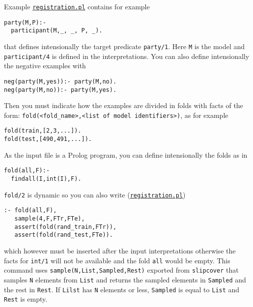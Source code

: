 Example \href{http://cplint.lamping.unife.it/example/registration.pl}{\texttt{registration.pl}} contains for example
\begin{verbatim}
party(M,P):-
  participant(M,_, _, P, _).
\end{verbatim}
that defines intensionally the target predicate \verb|party/1|. Here \verb|M| is the model and \verb|participant/4| is defined in the interpretations.
You can also define intensionally the negative examples with
\begin{verbatim}
neg(party(M,yes)):- party(M,no).
neg(party(M,no)):- party(M,yes).
\end{verbatim}
Then you must indicate how the examples are divided in folds with facts of the form:
\verb|fold(<fold_name>,<list of model identifiers>)|, as for example
\begin{verbatim}
fold(train,[2,3,...]).
fold(test,[490,491,...]).
\end{verbatim}
As the input file is a Prolog program, you can define intensionally the folds as in
\begin{verbatim}
fold(all,F):-
  findall(I,int(I),F).
\end{verbatim}
\verb|fold/2| is dynamic so you can also write (\href{http://cplint.lamping.unife.it/example/registration.pl}{\texttt{registration.pl}})
\begin{verbatim}
:- fold(all,F),
   sample(4,F,FTr,FTe),
   assert(fold(rand_train,FTr)),
   assert(fold(rand_test,FTe)).
\end{verbatim}
which however must be inserted after the input interpretations otherwise the facts for \verb|int/1| will not be available and
the fold \verb|all| would be empty. This command uses  \verb|sample(N,List,Sampled,Rest)| exported from \verb|slipcover| that samples \verb|N| elements from \verb|List| and returns the sampled elements in \verb|Sampled| and the rest in \verb|Rest|. If \verb|Lilst| has \verb|N| elements or less, \verb|Sampled| is equal to \verb|List| 
and \verb|Rest| is empty.